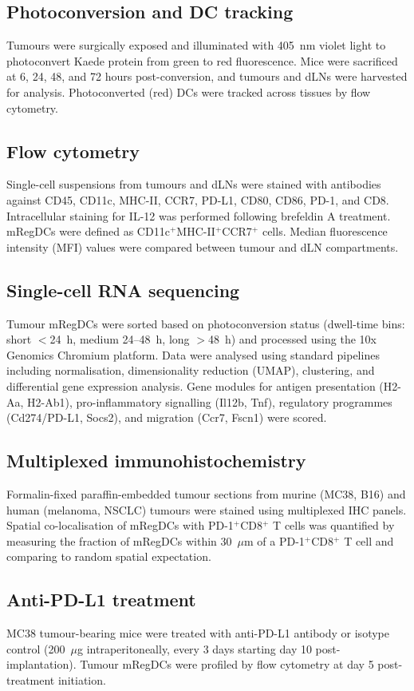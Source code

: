 \documentclass[11pt]{article}
\begin{document}
\subsection{Photoconversion and DC tracking}
Tumours were surgically exposed and illuminated with 405~nm violet light to photoconvert Kaede protein from green to red fluorescence. Mice were sacrificed at 6, 24, 48, and 72 hours post-conversion, and tumours and dLNs were harvested for analysis. Photoconverted (red) DCs were tracked across tissues by flow cytometry.

\subsection{Flow cytometry}
Single-cell suspensions from tumours and dLNs were stained with antibodies against CD45, CD11c, MHC-II, CCR7, PD-L1, CD80, CD86, PD-1, and CD8. Intracellular staining for IL-12 was performed following brefeldin A treatment. mRegDCs were defined as CD11c$^{+}$MHC-II$^{+}$CCR7$^{+}$ cells. Median fluorescence intensity (MFI) values were compared between tumour and dLN compartments.

\subsection{Single-cell RNA sequencing}
Tumour mRegDCs were sorted based on photoconversion status (dwell-time bins: short $<$24~h, medium 24--48~h, long $>$48~h) and processed using the 10x Genomics Chromium platform. Data were analysed using standard pipelines including normalisation, dimensionality reduction (UMAP), clustering, and differential gene expression analysis. Gene modules for antigen presentation (H2-Aa, H2-Ab1), pro-inflammatory signalling (Il12b, Tnf), regulatory programmes (Cd274/PD-L1, Socs2), and migration (Ccr7, Fscn1) were scored.

\subsection{Multiplexed immunohistochemistry}
Formalin-fixed paraffin-embedded tumour sections from murine (MC38, B16) and human (melanoma, NSCLC) tumours were stained using multiplexed IHC panels. Spatial co-localisation of mRegDCs with PD-1$^{+}$CD8$^{+}$ T cells was quantified by measuring the fraction of mRegDCs within 30~$\mu$m of a PD-1$^{+}$CD8$^{+}$ T cell and comparing to random spatial expectation.

\subsection{Anti-PD-L1 treatment}
MC38 tumour-bearing mice were treated with anti-PD-L1 antibody or isotype control (200~$\mu$g intraperitoneally, every 3 days starting day 10 post-implantation). Tumour mRegDCs were profiled by flow cytometry at day 5 post-treatment initiation.
\end{document}
